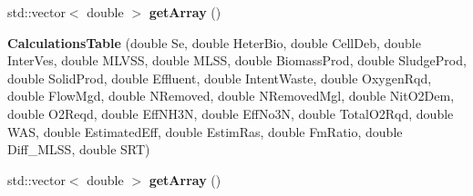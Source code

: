 \begin{DoxyCompactItemize}
\item 
\mbox{\label{struct_waste_water___treatment_1_1_calculations_table_a4d68d7c0ddce2f420de08e751c7efce8}} 
std\+::vector$<$ double $>$ {\bfseries get\+Array} ()
\item 
\mbox{\label{struct_waste_water___treatment_1_1_calculations_table_a8ddbd7786528c0de36340605a92a8efd}} 
{\bfseries Calculations\+Table} (double Se, double Heter\+Bio, double Cell\+Deb, double Inter\+Ves, double M\+L\+V\+SS, double M\+L\+SS, double Biomass\+Prod, double Sludge\+Prod, double Solid\+Prod, double Effluent, double Intent\+Waste, double Oxygen\+Rqd, double Flow\+Mgd, double N\+Removed, double N\+Removed\+Mgl, double Nit\+O2\+Dem, double O2\+Reqd, double Eff\+N\+H3N, double Eff\+No3N, double Total\+O2\+Rqd, double W\+AS, double Estimated\+Eff, double Estim\+Ras, double Fm\+Ratio, double Diff\+\_\+\+M\+L\+SS, double S\+RT)
\item 
\mbox{\label{struct_waste_water___treatment_1_1_calculations_table_a4d68d7c0ddce2f420de08e751c7efce8}} 
std\+::vector$<$ double $>$ {\bfseries get\+Array} ()
\end{DoxyCompactItemize}
